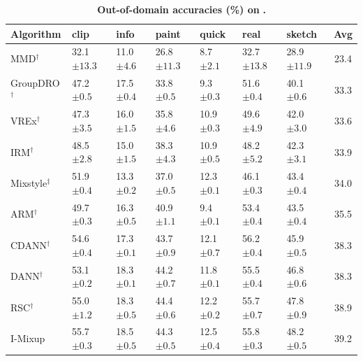 \begin{table}[H]
\centering
\small
\renewcommand{\arraystretch}{1.1}
\caption{\small\textbf{Out-of-domain accuracies (\%) on} \textbf{.}}
\begin{tabular}{lllllll|c}
\toprule
\textbf{Algorithm} & \textbf{clip} & \textbf{info} & \textbf{paint} & \textbf{quick} & \textbf{real} & \textbf{sketch} & \textbf{Avg} \\
\midrule
MMD$^\dagger$ & 32.1 \scriptsize$\pm13.3$ & 11.0 \scriptsize$\pm4.6$ & 26.8 \scriptsize$\pm11.3$ & 8.7 \scriptsize$\pm2.1$ & 32.7 \scriptsize$\pm13.8$ & 28.9 \scriptsize$\pm11.9$ & 23.4 \\
GroupDRO$^\dagger$ & 47.2 \scriptsize$\pm0.5$ & 17.5 \scriptsize$\pm0.4$ & 33.8 \scriptsize$\pm0.5$ & 9.3 \scriptsize$\pm0.3$ & 51.6 \scriptsize$\pm0.4$ & 40.1 \scriptsize$\pm0.6$ & 33.3 \\
VREx$^\dagger$ & 47.3 \scriptsize$\pm3.5$ & 16.0 \scriptsize$\pm1.5$ & 35.8 \scriptsize$\pm4.6$ & 10.9 \scriptsize$\pm0.3$ & 49.6 \scriptsize$\pm4.9$ & 42.0 \scriptsize$\pm3.0$ & 33.6 \\
IRM$^\dagger$ & 48.5 \scriptsize$\pm2.8$ & 15.0 \scriptsize$\pm1.5$ & 38.3 \scriptsize$\pm4.3$ & 10.9 \scriptsize$\pm0.5$ & 48.2 \scriptsize$\pm5.2$ & 42.3 \scriptsize$\pm3.1$ & 33.9 \\
Mixstyle$^\ddagger$ & 51.9 \scriptsize$\pm0.4$ & 13.3 \scriptsize$\pm0.2$ & 37.0 \scriptsize$\pm0.5$ & 12.3 \scriptsize$\pm0.1$ & 46.1 \scriptsize$\pm0.3$ & 43.4 \scriptsize$\pm0.4$ & 34.0 \\
ARM$^\dagger$ & 49.7 \scriptsize$\pm0.3$ & 16.3 \scriptsize$\pm0.5$ & 40.9 \scriptsize$\pm1.1$ & 9.4 \scriptsize$\pm0.1$ & 53.4 \scriptsize$\pm0.4$ & 43.5 \scriptsize$\pm0.4$ & 35.5 \\
CDANN$^\dagger$ & 54.6 \scriptsize$\pm0.4$ & 17.3 \scriptsize$\pm0.1$ & 43.7 \scriptsize$\pm0.9$ & 12.1 \scriptsize$\pm0.7$ & 56.2 \scriptsize$\pm0.4$ & 45.9 \scriptsize$\pm0.5$ & 38.3 \\
DANN$^\dagger$ & 53.1 \scriptsize$\pm0.2$ & 18.3 \scriptsize$\pm0.1$ & 44.2 \scriptsize$\pm0.7$ & 11.8 \scriptsize$\pm0.1$ & 55.5 \scriptsize$\pm0.4$ & 46.8 \scriptsize$\pm0.6$ & 38.3 \\
RSC$^\dagger$ & 55.0 \scriptsize$\pm1.2$ & 18.3 \scriptsize$\pm0.5$ & 44.4 \scriptsize$\pm0.6$ & 12.2 \scriptsize$\pm0.2$ & 55.7 \scriptsize$\pm0.7$ & 47.8 \scriptsize$\pm0.9$ & 38.9 \\
I-Mixup & 55.7 \scriptsize$\pm0.3$ & 18.5 \scriptsize$\pm0.5$ & 44.3 \scriptsize$\pm0.5$ & 12.5 \scriptsize$\pm0.4$ & 55.8 \scriptsize$\pm0.3$ & 48.2 \scriptsize$\pm0.5$ & 39.2 \\

\end{tabular}
\end{table}
